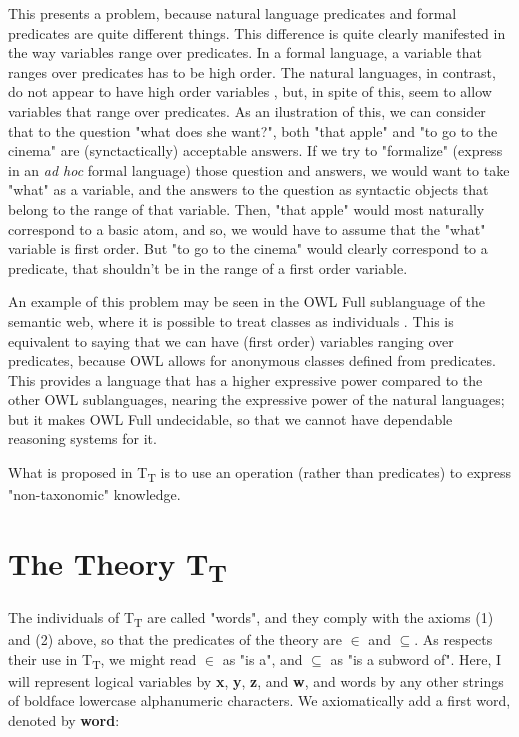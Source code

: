 \documentclass{IOS-Book-Article}     %
\begin{document}
This presents a problem, because natural language predicates and formal
predicates are quite different things. This difference is quite clearly
manifested in the way variables range over predicates. In a formal language,
a variable that ranges over predicates has to be high order.
The natural languages, in contrast, do not appear to have high
order variables \cite{r5}, but, in spite of this, seem to allow
variables that range over predicates. As an ilustration of this,
we can consider that to the question "what does she want?", both "that apple"
and "to go to the cinema" are (synctactically) acceptable answers.
If we try to "formalize" (express in an \textit{ad hoc} formal language)
those question and answers, we would
want to take "what" as a variable, and the answers to the question as
syntactic objects that belong to the range of that variable.
Then, "that apple" would most naturally correspond to a basic atom,
and so, we would have to assume that the "what" variable is first order.
But "to go to the cinema" would clearly correspond to a predicate,
that shouldn't be in the range of a first order variable.

An example of this problem may be seen in the OWL Full sublanguage of
the semantic web, where it is possible to treat classes as individuals
\cite{r6}. This is equivalent to saying that we can have (first order)
variables ranging over predicates, because OWL
allows for anonymous classes defined from predicates. This provides a
language that has a higher expressive power compared to the other OWL
sublanguages, nearing the expressive power of the natural languages;
but it makes OWL Full undecidable, so that we cannot have dependable
reasoning systems for it.

What is proposed in T\textsubscript{T} is to use an operation
(rather than predicates) to express "non-taxonomic" knowledge.

\section{The Theory T\textsubscript{T}}
The individuals of T\textsubscript{T} are called "words", and they comply with
the axioms (1) and (2) above, so that the predicates of the theory are
$\in$ and $\subseteq$. As respects their use in T\textsubscript{T},
we might read $\in$ as "is a", and $\subseteq$ as "is a subword of".
Here, I will represent logical variables
by \textbf{x}, \textbf{y}, \textbf{z}, and \textbf{w}, and words
by any other strings of boldface lowercase alphanumeric
characters. We axiomatically add a first word, denoted by \textbf{word}:
\end{document}
